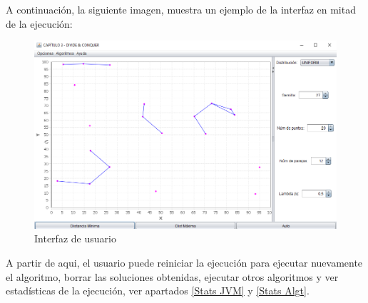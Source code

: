 A continuación, la siguiente imagen, muestra un ejemplo de la interfaz en mitad de la ejecución:

\begin{figure}[!h]
    \centering
    \includegraphics[width=\linewidth]{Usage/img/ejecucion.png}
    \caption{Interfaz de usuario}
    \label{fig:Ejemplo ejecución}
\end{figure}

A partir de aqui, el usuario puede reiniciar la ejecución para ejecutar nuevamente el algoritmo, borrar las soluciones obtenidas, ejecutar otros algoritmos y ver estadísticas de la ejecución, ver apartados \ref{Stats JVM} y \ref{Stats Algt}.
